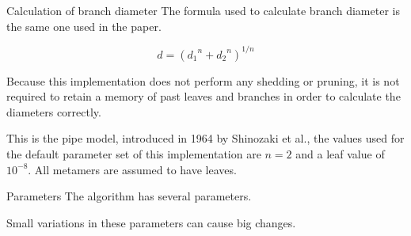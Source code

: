 \documentclass{beamer}
\begin{document}
\begin{frame}{Calculation of branch diameter}
The formula used to calculate branch diameter is the same one used in the paper.

\[d = \left({d_1}^n + {d_2}^n\right)^{1 / n}\]

Because this implementation does not perform any shedding or pruning, it is not required to retain a memory of past leaves and branches in order to calculate the diameters correctly.

This is the pipe model, introduced in 1964 by Shinozaki et al., the values used for the default parameter set of this implementation are \(n = 2\) and a leaf value of \(10^{-8}\). All metamers are assumed to have leaves.
\end{frame}


\begin{frame}{Parameters}
The algorithm has several parameters.

Small variations in these parameters can cause big changes.
\begin{table}
\end{table}
\end{frame}
\end{document}
